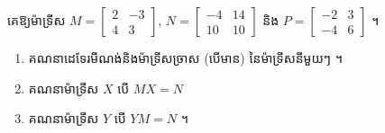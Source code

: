 \begin{example}[លំហាត់គំរូ ១]
គេឱ្យម៉ាទ្រីស $M = \begin{bmatrix} 2 & -3\\ 4 & 3 \end{bmatrix}$, $N = \begin{bmatrix} -4 & 14\\ 10 & 10 \end{bmatrix}$ និង $P = \begin{bmatrix} -2 & 3\\ -4 & 6 \end{bmatrix}$ ។
\begin{enumerate}[a]
  \item គណនាដេទែរមីណង់និងម៉ាទ្រីសច្រាស (បើមាន) នៃម៉ាទ្រីសនីមួយៗ ។
  \item គណនាម៉ាទ្រីស $X$ បើ $MX = N$
  \item គណនាម៉ាទ្រីស $Y$ បើ $YM = N$ ។
\end{enumerate}
\end{example}
\ans
